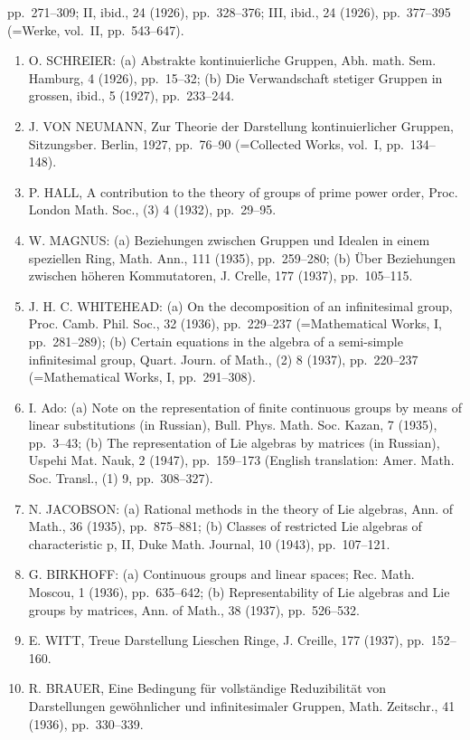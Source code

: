 pp.~271--309; II, ibid., 24 (1926), pp.~328--376; III, ibid., 24 (1926), pp.~377--395 (=Werke, vol.~II, pp.~543--647).

\begin{enumerate}
\def\labelenumi{\arabic{enumi}.}
\setcounter{enumi}{21}
\item
  O. SCHREIER: (a) Abstrakte kontinuierliche Gruppen, Abh. math. Sem. Hamburg, 4 (1926), pp.~15--32; (b) Die Verwandschaft stetiger Gruppen in grossen, ibid., 5 (1927), pp.~233--244.
\item
  J. VON NEUMANN, Zur Theorie der Darstellung kontinuierlicher Gruppen, Sitzungsber. Berlin, 1927, pp.~76--90 (=Collected Works, vol.~I, pp.~134--148).
\item
  P. HALL, A contribution to the theory of groups of prime power order, Proc. London Math. Soc., (3) 4 (1932), pp.~29--95.
\item
  W. MAGNUS: (a) Beziehungen zwischen Gruppen und Idealen in einem speziellen Ring, Math. Ann., 111 (1935), pp.~259--280; (b) Über Beziehungen zwischen höheren Kommutatoren, J. Crelle, 177 (1937), pp.~105--115.
\item
  J. H. C. WHITEHEAD: (a) On the decomposition of an infinitesimal group, Proc. Camb. Phil. Soc., 32 (1936), pp.~229--237 (=Mathematical Works, I, pp.~281--289); (b) Certain equations in the algebra of a semi-simple infinitesimal group, Quart. Journ. of Math., (2) 8 (1937), pp.~220--237 (=Mathematical Works, I, pp.~291--308).
\item
  I. Ado: (a) Note on the representation of finite continuous groups by means of linear substitutions (in Russian), Bull. Phys. Math. Soc. Kazan, 7 (1935), pp.~3--43; (b) The representation of Lie algebras by matrices (in Russian), Uspehi Mat. Nauk, 2 (1947), pp.~159--173 (English translation: Amer. Math. Soc. Transl., (1) 9, pp.~308--327).
\item
  N. JACOBSON: (a) Rational methods in the theory of Lie algebras, Ann. of Math., 36 (1935), pp.~875--881; (b) Classes of restricted Lie algebras of characteristic p, II, Duke Math. Journal, 10 (1943), pp.~107--121.
\item
  G. BIRKHOFF: (a) Continuous groups and linear spaces; Rec. Math. Moscou, 1 (1936), pp.~635--642; (b) Representability of Lie algebras and Lie groups by matrices, Ann. of Math., 38 (1937), pp.~526--532.
\item
  E. WITT, Treue Darstellung Lieschen Ringe, J. Creille, 177 (1937), pp.~152--160.
\item
  R. BRAUER, Eine Bedingung für vollständige Reduzibilität von Darstellungen gewöhnlicher und infinitesimaler Gruppen, Math. Zeitschr., 41 (1936), pp.~330--339.

\end{enumerate}
